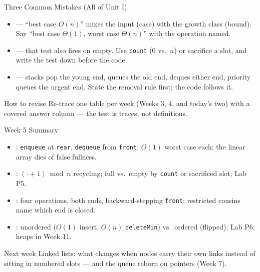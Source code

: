 \documentclass[aspectratio=169]{beamer}
\begin{document}
\begin{frame}{Three Common Mistakes (All of Unit I)}
  \begin{itemize}
    \item {} --- ``best case $O(n)$''
      mixes the input (case) with the growth class (bound). Say ``best case
      $\Theta(1)$, worst case $\Theta(n)$'' with the operation named.
    \item {} --- that test
      also fires on empty. Use \texttt{count} ($0$ vs.\ $n$) or sacrifice a
      slot, and write the test down before the code.
    \item {} --- stacks pop the young end, queues the
      old end, deques either end, priority queues the urgent end. State the
      removal rule first; the code follows it.
  \end{itemize}
  \begin{exampleblock}{How to revise}
    Re-trace one table per week (Weeks 3, 4, and today's two) with a covered
    answer column --- the test is traces, not definitions.
  \end{exampleblock}
\end{frame}

\begin{frame}{Week 5 Summary}
  \begin{itemize}
    \item {}: \texttt{enqueue} at \texttt{rear}, \texttt{dequeue}
      from \texttt{front}; $O(1)$ worst case each; the linear array dies of
      false fullness.
    \item {}: $(\cdot + 1) \bmod n$ recycling; full vs.\
      empty by \texttt{count} or sacrificed slot; Lab P5.
    \item {}: four operations, both ends, backward-stepping
      \texttt{front}; restricted cousins name which end is closed.
    \item \key{Priority queue on arrays}: unordered ($O(1)$ insert, $O(n)$
      \texttt{deleteMin}) vs.\ ordered (flipped); Lab P6; heaps in Week 11.
  \end{itemize}
  \begin{exampleblock}{Next week}
    Linked lists: what changes when nodes carry their own links instead of
    sitting in numbered slots --- and the queue reborn on pointers (Week 7).
  \end{exampleblock}
\end{frame}
\end{document}
